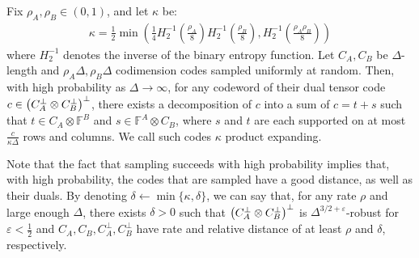 \begin{theorem}
Fix $\rho_A, \rho_B \in (0,1)$, and let $\kappa$ be:
\begin{equation*}
  \begin{split}
    \kappa = \frac{1}{2}\min\left( \frac{1}{4}H_{2}^{-1}\left( \frac{\rho_{A}}{8} \right) H_{2}^{-1}\left( \frac{\rho_{B}}{8} \right), H_{2}^{-1}\left( \frac{\rho_{A}\rho_{B}}{8} \right)\right)
  \end{split}
\end{equation*}
where $H^{-1}_{2}$ denotes the inverse of the binary entropy function. Let $C_A, C_B$ be $\Delta$-length and $\rho_A \Delta, \rho_B \Delta$ codimension codes sampled uniformly at random. Then, with high probability as $\Delta \rightarrow \infty$, for any codeword of their dual tensor code $c \in \left( C_{A}^{\perp}\otimes C_{B}^{\perp} \right)^{\perp}$, there exists a decomposition of $c$ into a sum of $c = t + s$ such that $t \in C_A \otimes \mathbb{F}^B$ and $s \in \mathbb{F}^A \otimes C_B$, where $s$ and $t$ are each supported on at most $\frac{c}{\kappa \Delta}$ rows and columns. We call such codes $\kappa$ product expanding.
\end{theorem}

Note that the fact that sampling succeeds with high probability implies that, with high probability, the codes that are sampled have a good distance, as well as their duals. By denoting $\delta \leftarrow \min\{\kappa, \delta\}$, we can say that, for any rate $\rho$ and large enough $\Delta$, there exists $\delta > 0$ such that $\left( C_{A}^{\perp}\otimes C_{B}^{\perp} \right)^{\perp}$ is $\Delta^{3/2+\varepsilon}$-robust for $\varepsilon < \frac{1}{2}$ and $C_{A},C_{B},C_{A}^{\perp},C_{B}^{\perp}$ have rate and relative distance of at least $\rho$ and $\delta$, respectively.

